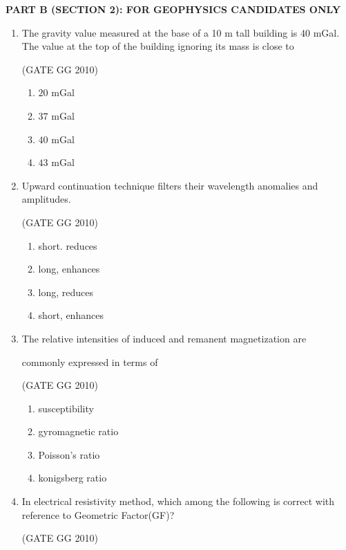 \documentclass[journal]{IEEEtran}
\begin{document}
\textbf{PART B (SECTION 2): FOR GEOPHYSICS CANDIDATES ONLY}
\begin{enumerate}[start=26]
    \item The gravity value measured at the base of a 10 m tall building is 40 mGal. The value at the top of the building ignoring its mass is close to
    
\hfill (GATE GG 2010) 
\begin{multicols}{4}

\begin{enumerate}
    \item $20$ mGal
\item  $37$ mGal
\item $40$ mGal
\item $43$ mGal
\end{enumerate}
\end{multicols}

\item Upward continuation technique filters their wavelength anomalies and amplitudes.

\hfill (GATE GG 2010) 
\begin{enumerate}
    \item short. reduces

\item long, enhances

\item long, reduces
\item  short, enhances
\end{enumerate}

\item The relative intensities of induced and remanent magnetization are 

commonly expressed in terms of

\hfill (GATE GG 2010) 
\begin{enumerate}
    \item  susceptibility

\item  gyromagnetic ratio

\item  Poisson's ratio

\item konigsberg ratio
 
\end{enumerate}
\item  In electrical resistivity method, which among the following is correct with reference to Geometric Factor(GF)? 

\hfill(GATE GG 2010)


\end{enumerate}
\end{document}
